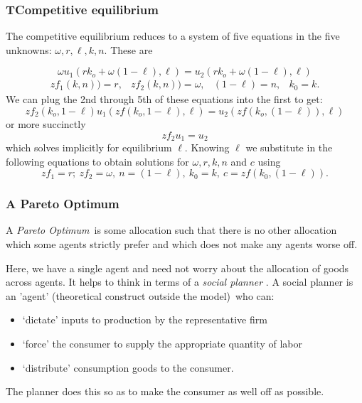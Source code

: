 \documentclass[aspectratio=169]{ltx-talk}
\begin{document}
\begin{frame}
\frametitle{TCompetitive equilibrium}
The competitive equilibrium reduces to a system of five equations in the
five unknowns: $\omega ,r,\ell ,k,n.$ These are

\begin{equation*}
\omega u_{1}(rk_{o}+\omega \left( 1-\ell \right) ,\ell )=u_{2}(rk_{o}+\omega
\left( 1-\ell \right) ,\ell )
\end{equation*}%
\begin{equation*}
\begin{array}{llll}
zf_{1}\left( k,n\right) )=r, & zf_{2}\left( k,n\right) )=\omega , & (1-\ell
)=n, & k_{0}=k.%
\end{array}%
\end{equation*}%
We can plug the 2nd through 5th of these equations into the first to get: 
\begin{equation*}
zf_{2}\left( k_{o},1-\ell \right) u_{1}(zf\left( k_{o},1-\ell \right) ,\ell
)=u_{2}(zf\left( k_{o},\left( 1-\ell \right) \right) ,\ell )
\end{equation*}%
or more succinctly%
\begin{equation*}
zf_{2}u_{1}=u_{2}
\end{equation*}%
which solves implicitly for equilibrium $\ell $. Knowing $\ell $ we
substitute in the following equations to obtain solutions for $\omega ,r,k,n$
and $c$ using%
\begin{equation*}
zf_{1}=r;~zf_{2}=\omega ,~n=(1-\ell ),~k_{0}=k,~c=zf\left( k_{0},(1-\ell
)\right) .
\end{equation*}
\end{frame}

\begin{frame}
\frametitle{A Pareto Optimum }
A \textit{Pareto Optimum}\ is some allocation such that there is no other
allocation which some agents strictly prefer and which does not make any
agents worse off.
\par{}


Here, we have a single agent and need not worry about the allocation of
goods across agents. It helps to think in terms of a \textit{social planner}%
. A social planner is an 'agent' (theoretical construct outside the model)\
who can:

\begin{itemize}
\item `dictate' inputs to production by the representative firm

\item `force' the consumer to supply the appropriate quantity of labor

\item `distribute' consumption goods to the consumer.
\end{itemize}

The planner does this so as to make the consumer as well off as possible.
\end{frame}
\end{document}
